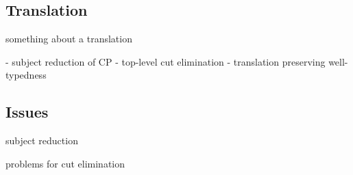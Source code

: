 \documentclass{beamer}
\begin{document}
\begin{comment}
GV has built-in support for session types. consider the rule for sending a
value of type T along a channel N of type !T.S.
\end{comment}

\subsection{Translation}

\begin{frame}
something about a translation
\end{frame}

\begin{comment}
the translation to CP is
presented. blah blah something about the session types being a little odd or
overlook this probably
\end{comment}

\begin{frame}
- subject reduction of CP
- top-level cut elimination
- translation preserving well-typedness
\end{frame}

\subsection{Issues}

\begin{comment}
the system has three main properties. subject reduction of CP, top-level
cut-elimination and translation preserving well-typedness. of which subject
reduction is the only one fully formalised. the other two presented some
challenges but some comments on progress towards the other two is
offered. i also highlight some issues and guidelines
\end{comment}

\begin{frame}
subject reduction
\end{frame}

\begin{comment}
subject reduction is formalised using a relation on processes
\end{comment}

\begin{frame}
problems for cut elimination
\end{frame}

\begin{comment}
sessions correspond to propositions
processes correspond to proofs
cut elimination corresponds to communication

cut elimination is not currently proven since we require a termination measure
on the length of a derivation and a relationship between the subprocesses of a
cut. other work based on formalising logics where the derivations are explicit
may be inspirational
\end{comment}
\end{document}
